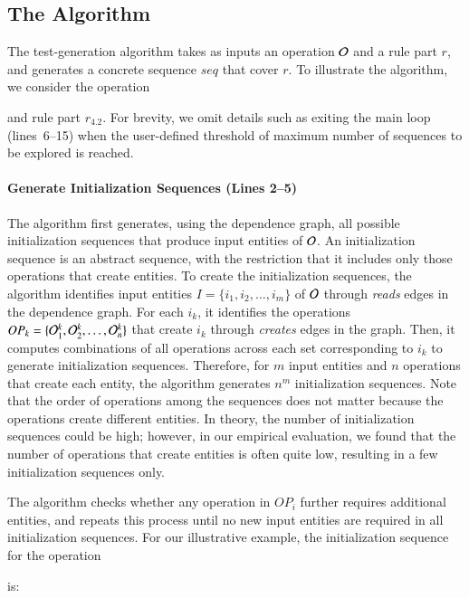 \subsection{The Algorithm}
\label{sec:technique}

The test-generation algorithm takes as inputs an operation ${\cal O}$ and a rule
part $r$, and generates a concrete sequence $seq$ that cover $r$. To illustrate
the algorithm, we consider the operation \subject{GenerateInvoice} and rule part
$r_{4.2}$. For brevity, we omit details such as exiting the main loop
(lines~6--15) when the user-defined threshold of maximum number of sequences to
be explored is reached.

\vskip -7pt
\paragraph*{Generate Initialization Sequences (Lines 2--5)} The algorithm first
generates, using the dependence graph, all possible initialization sequences
that produce input entities of ${\cal O}$. An initialization sequence is an
abstract sequence, with the restriction that it includes only those operations
that create entities. To create the initialization sequences, the algorithm
identifies input entities $I = \{i_1, i_2, \ldots, i_m\}$ of ${\cal O}$ through
\textit{reads} edges in the dependence graph. For each $i_k$, it identifies the
operations $OP_k = \{{\cal O}^k_1, {\cal O}^k_2, \ldots, {\cal O}^k_n\}$ that
create $i_k$ through \textit{creates} edges in the graph.
Then, it computes combinations of all operations across each set corresponding
to $i_k$ to generate initialization sequences. Therefore, for $m$ input entities
and $n$ operations that create each entity, the algorithm generates $n^m$
initialization sequences. Note that the order of operations among the sequences
does not matter because the operations create different entities.  In theory,
the number of initialization sequences could be high; however, in our empirical
evaluation, we found that the number of operations that create entities is often
quite low, resulting in a few initialization sequences only.

The algorithm checks whether any operation in $OP_i$ further requires additional
entities, and repeats this process until no new input entities are required in
all initialization sequences.  For our illustrative example, the initialization
sequence for the operation \subject{GenerateInvoice} is:

